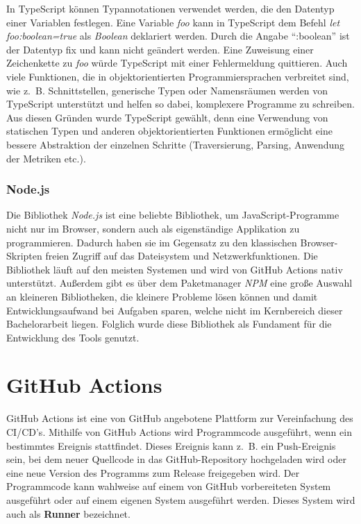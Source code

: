 In TypeScript können Typannotationen verwendet werden, die den Datentyp einer Variablen festlegen. Eine Variable \textit{foo} kann in TypeScript dem Befehl \textit{let foo:boolean=true} als \textit{Boolean} deklariert werden. Durch die Angabe \enquote{:boolean} ist der Datentyp fix und kann nicht geändert werden. Eine Zuweisung einer Zeichenkette zu \textit{foo} würde TypeScript mit einer Fehlermeldung quittieren. Auch viele Funktionen, die in objektorientierten Programmiersprachen verbreitet sind, wie z.~B. Schnittstellen, generische Typen oder Namensräumen werden von TypeScript unterstützt und helfen so dabei, komplexere Programme zu schreiben. Aus diesen Gründen wurde TypeScript gewählt, denn eine Verwendung von statischen Typen und anderen objektorientierten Funktionen ermöglicht eine bessere Abstraktion der einzelnen Schritte (Traversierung, Parsing, Anwendung der Metriken etc.). 

\subsubsection{Node.js}
Die Bibliothek  \textit{Node.js} ist eine beliebte Bibliothek, um JavaScript-Programme nicht nur im Browser, sondern auch als eigenständige Applikation zu programmieren. Dadurch haben sie im Gegensatz zu den klassischen Browser-Skripten freien Zugriff auf das Dateisystem und Netzwerkfunktionen.  Die Bibliothek läuft auf den meisten Systemen und  wird von GitHub Actions nativ unterstützt. Außerdem gibt es über dem Paketmanager \textit{NPM} eine große Auswahl an kleineren Bibliotheken, die kleinere Probleme lösen können und damit Entwicklungsaufwand bei Aufgaben sparen, welche nicht im Kernbereich dieser Bachelorarbeit liegen. Folglich wurde diese Bibliothek als Fundament für die Entwicklung des Tools genutzt. 

\section{GitHub Actions}\label{chapter:github_actions}

GitHub Actions \cite{GithubActions} ist eine von GitHub angebotene Plattform zur Vereinfachung des \ac{CI/CD}'s. Mithilfe von  GitHub Actions wird Programmcode ausgeführt, wenn ein bestimmtes Ereignis stattfindet. Dieses Ereignis kann z.~B. ein Push-Ereignis sein, bei dem neuer Quellcode in das GitHub-Repository hochgeladen wird oder eine neue Version des Programms zum Release freigegeben wird. Der Programmcode kann wahlweise auf einem von  GitHub vorbereiteten System ausgeführt oder auf einem eigenen System ausgeführt werden. Dieses System wird auch als \textbf{Runner} bezeichnet.

